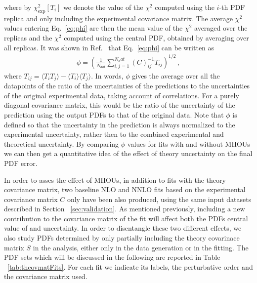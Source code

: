     where by $\chi^2_{\text{exp}}\left[T_i\right]$ we denote the value of the $\chi^2$
    computed using the $i$-th PDF replica and only including the experimental covariance matrix.
    The average $\chi^2$ values entering Eq.~\ref{eq:phi} are then the mean value of the $\chi^2$ averaged over the replicas
    and the $\chi^2$ computed using the central PDF, obtained by averaging over all replicas. 
    It was shown in Ref.~\cite{Ball:2014uwa} that Eq.~\ref{eq:phi} can be written as
    \begin{align}
        \phi = \left(\frac{1}{N_{dat}}\sum_{i,j=1}^{N_dat} \left(C\right)^{-1}_{ij}T_{ij}\right)^{1/2}\,,
    \end{align}
    where $T_{ij} = \langle T_i T_j \rangle - \langle T_i \rangle \langle T_j \rangle$. In words,
    $\phi$ gives the average over all the datapoints of the ratio of the uncertainties of the predictions
    to the uncertainties of the original experimental data, taking account of correlations. For a purely diagonal
    covariance matrix, this would be the ratio of the uncertainty of the prediction using the output PDFs
    to that of the original data. Note that  $\phi$ is defined so that the uncertainty in the prediction is always
    normalized to the experimental uncertainty, rather then to the combined experimental and theoretical uncertainty.
    By comparing $\phi$ values for fits with and without MHOUs we can then get a quantitative idea of the effect of theory
    uncertainty on the final PDF error.

    In order to asses the effect of MHOUs, in addition to fits with the theory covariance matrix, two baseline
    NLO and NNLO fits based on the experimental covariance matrix $C$ only have been also produced, 
    using the same input datasets described in Section ~\ref{sec:validation}. 
    As mentioned previously, including a new contribution to the covariance matrix of the fit
    will affect both the PDFs central value of and uncertainty. In order to disentangle these
    two different effects, we also study PDFs determined by only partially 
    including the theory covarinace matrix $S$ in the analysis, either only in the data generation or in the fitting. 
    The PDF sets which will be discussed in the following are reported in Table ~\ref{tab:thcovmatFits}. 
    For each fit we indicate its labels, the perturbative order and the covariance matrix used.
    


